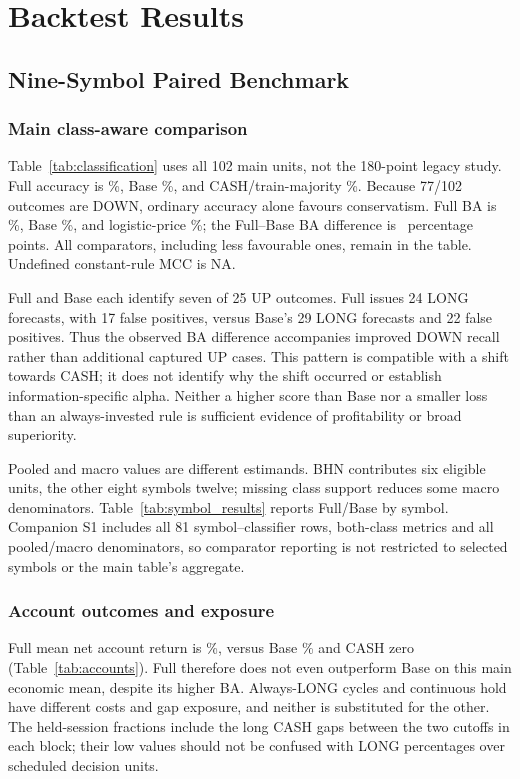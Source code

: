 \section{Backtest Results}
\label{sec:backtestresults}

\subsection{Nine-Symbol Paired Benchmark}
\subsubsection{Main class-aware comparison}
Table~\ref{tab:classification} uses all 102 main units, not the 180-point legacy study. Full accuracy is \FullAccuracy\%, Base \BaseAccuracy\%, and CASH/train-majority \CashAccuracy\%. Because 77/102 outcomes are DOWN, ordinary accuracy alone favours conservatism. Full BA is \FullBA\%, Base \BaseBA\%, and logistic-price \LogisticPriceBA\%; the Full--Base BA difference is \DeltaBA\ percentage points. All comparators, including less favourable ones, remain in the table. Undefined constant-rule MCC is NA.

Full and Base each identify seven of 25 UP outcomes. Full issues 24 LONG forecasts, with 17 false positives, versus Base's 29 LONG forecasts and 22 false positives. Thus the observed BA difference accompanies improved DOWN recall rather than additional captured UP cases. This pattern is compatible with a shift towards CASH; it does not identify why the shift occurred or establish information-specific alpha. Neither a higher score than Base nor a smaller loss than an always-invested rule is sufficient evidence of profitability or broad superiority.

Pooled and macro values are different estimands. BHN contributes six eligible units, the other eight symbols twelve; missing class support reduces some macro denominators. Table~\ref{tab:symbol_results} reports Full/Base by symbol. Companion S1 includes all 81 symbol--classifier rows, both-class metrics and all pooled/macro denominators, so comparator reporting is not restricted to selected symbols or the main table's aggregate.


\subsubsection{Account outcomes and exposure}
Full mean net account return is \FullReturn\%, versus Base \BaseReturn\% and CASH zero (Table~\ref{tab:accounts}). Full therefore does not even outperform Base on this main economic mean, despite its higher BA. Always-LONG cycles and continuous hold have different costs and gap exposure, and neither is substituted for the other. The held-session fractions include the long CASH gaps between the two cutoffs in each block; their low values should not be confused with LONG percentages over scheduled decision units.

